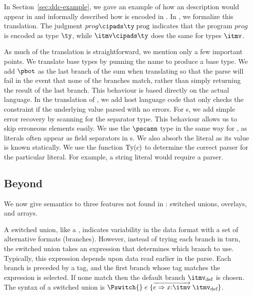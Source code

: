 In Section~\ref{sec:ddc-example}, we gave an example of how an
\ipads{} description would appear in \ddc{} and informally described
how \ipads{} is encoded in \ddc{}. In , we
formalize this translation. The judgment ${prog} \cipads \ty\;
\text{prog}$ indicates that the \ipads{} program ${prog}$ is encoded
as \ddc{} type $\ty$, while $\itmv \cipads \ty$ does the same
for \ipads{} types $\itmv$.

As much of the translation is straightforward, we mention only a few
important points. We translate base types by punning the \ipads{} name
to produce a \ddc base type. We add $\pbot$ as the last branch of the
\ddc{} sum when translating \Punion{} so that the parse will fail in
the event that none of the branches match, rather than simply
returning the result of the last branch. This behaviour is based
directly on the actual \pads{} language. In the translation of
\Pwhere{}, we add host language code that only checks the constraint
if the underlying value parsed with no errors. For \Parray{}s, we add
simple error recovery by scanning for the separator type.  This
behaviour allows us to skip erroneous elements easily. We use the
$\pscann$ type in the same way for , as literals often
appear as field separators in \Pstruct{}s.  We also absorb the literal
as its value is known statically.  We use the function ${\rm Ty}(c)$
to determine the correct parser for the particular literal. For
example, a string literal would require a \Pstring{} parser.

\subsection{Beyond \ipads{}}

We now give semantics to three features not found in \ipads{}:
\pads{} switched unions, \packettypes{} overlays, and \datascript{} arrays.

A switched union, like a \Punion, indicates variability in the data
format with a set of alternative formats (branches). However, instead
of trying each branch in turn, the switched union takes an expression that
determines which branch to use. Typically, this expression depends upon data read earlier in the parse. Each branch is preceded by a tag,
and the first branch whose tag matches the expression is selected.
If none match then the default branch $\itmv_{\text{def}}$ is chosen.
The syntax of a switched union is $\Pswitch{}\;e\;\{\overrightarrow{e
  \Rightarrow x{:}\itmv}\; \itmv_{\text{def}}\}$.

